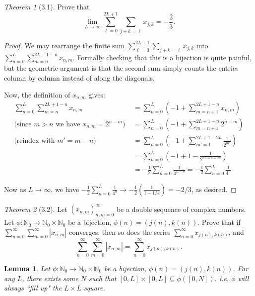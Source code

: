 \documentclass[12pt]{article}
\newtheorem*{lemma}{Lemma}
\theoremstyle{remark}
\theoremstyle{named}
\newtheorem*{theorem}{Theorem}
\begin{document}
\begin{theorem}[3.1]
    Prove that
    \[\lim_{L \to \infty} \sum_{\ell = 0}^{2L + 1} \sum_{j + k = \ell} x_{j, k} = -\frac{2}{3}.\]
\end{theorem}

\begin{proof}
    We may rearrange the finite sum \(\sum_{\ell = 0}^{2L + 1} \sum_{j + k = \ell} x_{j, k}\) into \(\sum_{n = 0}^L \sum_{m = n}^{2L + 1 - n} x_{n, m}\). Formally checking that this is a bijection is quite painful, but the geometric argument is that the second sum simply counts the entries column by column instead of along the diagonals.

    Now, the definition of \(x_{n, m}\) gives:
    \begin{align*}
        \sum_{n = 0}^L \sum_{m = n}^{2L + 1 - n} x_{n, m} &= \sum_{n = 0}^L \left(-1 + \sum_{m = n + 1}^{2L + 1 - n} x_{n, m}\right) \\ 
        \text{(since \(m > n\) we have \(x_{n, m} = 2^{n - m}\))  } &= \sum_{n = 0}^L \left(-1 + \sum_{m = n + 1}^{2L + 1 - n} 2^{n - m}\right) \\
        \text{(reindex with \(m' = m - n\))   } &= \sum_{n = 0}^L \left(-1 + \sum_{m' = 1}^{2L + 1 - 2n} \frac{1}{2^{m'}}\right) \\
        &= \sum_{n = 0}^L \left(-1 + 1 - \frac{1}{2^{2L + 1 - 2n}}\right) \\
        &= -\frac{1}{2} \sum_{n = 0}^L \frac{1}{4^{L - n}} = -\frac{1}{2} \sum_{n = 0}^L \frac{1}{4^{n}}
    \end{align*}

    Now as \(L \to \infty\), we have \(-\frac{1}{2} \sum_{n = 0}^L \frac{1}{4^{n}} \to -\frac{1}{2} \left(\frac{1}{1 - 1/4}\right) = -2/3\), as desired.
\end{proof}

\begin{theorem}[3.2]
    Let \((x_{n, m})_{n, m = 0}^\infty\) be a double sequence of complex numbers. Let \(\phi : \mathbb{N}_0 \to \mathbb{N}_0 \times \mathbb{N}_0\) be a bijection, \(\phi(n) = (j(n), k(n))\). Prove that if \(\sum_{n = 0}^\infty \sum_{m = 0}^\infty |x_{n, m}|\) converges, then so does the series \(\sum_{n = 0}^\infty x_{j(n), k(n)}\), and
    \[\sum_{n = 0}^\infty \sum_{m = 0}^\infty |x_{n, m}| = \sum_{n = 0}^\infty x_{j(n), k(n)}.\]
\end{theorem}

\begin{lemma}
    Let \(\phi : \mathbb{N}_0 \to \mathbb{N}_0 \times \mathbb{N}_0\) be a bijection, \(\phi(n) = (j(n), k(n))\). For any \(L\), there exists some \(N\) such that \([0, L] \times [0, L] \subseteq \phi([0, N])\). i.e. \(\phi\) will always ``fill up" the \(L \times L\) square.
\end{lemma}
\end{document}
